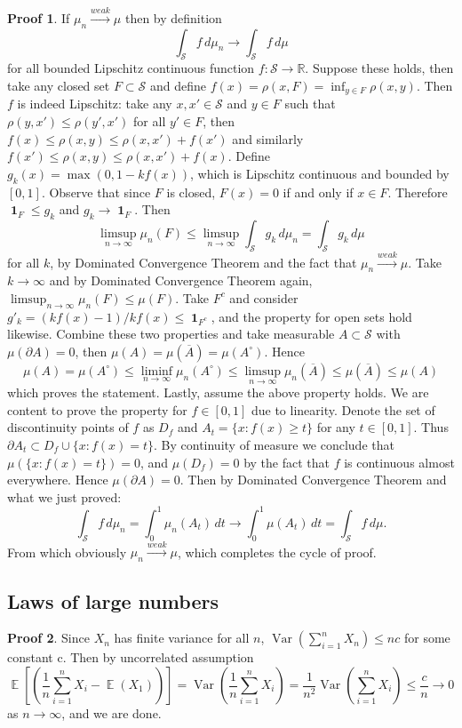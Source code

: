 \documentclass[hidelinks,11pt]{article}
\theoremstyle{definition}
\theoremstyle{dotless}
\newtheorem{prop}{Proof}[section]
\theoremstyle{remark}
\DeclareMathOperator{\Var}{Var}
\DeclareMathOperator{\E}{\mathbb{E}}
\DeclareMathOperator{\1}{\mathbf{1}}
\DeclareMathOperator{\0}{\mathbf{0}}
\begin{document}
\begin{prop}
If $\mu_n\xrightarrow{weak}\mu$ then by definition
\[\int_\mathcal{S}f\,d\mu_n\to\int_\mathcal{S}f\,d\mu\]
for all bounded Lipschitz continuous function $f:\mathcal{S}\to\mathbb{R}$.\medbreak
Suppose these holds, then take any closed set $F\subset\mathcal{S}$ and define $f(x)=\rho(x,F)=\inf_{y\in F}\rho(x,y)$. Then $f$ is indeed Lipschitz: take any $x,x'\in\mathcal{S}$ and $y\in F$ such that $\rho(y,x')\leq\rho(y',x')$ for all $y'\in F$, then $f(x)\leq\rho(x,y)\leq\rho(x,x')+f(x')$ and similarly $f(x')\leq\rho(x,y)\leq\rho(x,x')+f(x)$. Define $g_k(x)=\max(0,1-kf(x))$, which is Lipschitz continuous and bounded by $[0,1]$. Observe that since $F$ is closed, $F(x)=0$ if and only if $x\in F$. Therefore $\1_F\leq g_k$ and $g_k\to\1_F$. Then
\[\limsup_{n\to\infty}\mu_n(F)\leq\limsup_{n\to\infty}\int_\mathcal{S}g_k\,d\mu_n=\int_\mathcal{S}g_k\,d\mu\]
for all $k$, by Dominated Convergence Theorem and the fact that $\mu_n\xrightarrow{weak}\mu$. Take $k\to\infty$ and by Dominated Convergence Theorem again, $\limsup_{n\to\infty}\mu_n(F)\leq\mu(F)$. Take $F^c$ and consider $g'_k=(kf(x)-1)/kf(x)\leq\1_{F^c}$, and the property for open sets hold likewise.\medbreak
Combine these two properties and take measurable $A\subset\mathcal{S}$ with $\mu(\partial A)=0$, then $\mu(A)=\mu(\overline{A})=\mu(A^\circ)$. Hence
\[\mu(A)=\mu(A^\circ)\leq\liminf_{n\to\infty}\mu_n(A^\circ)\leq\limsup_{n\to\infty}\mu_n(\overline{A})\leq\mu(\overline{A})\leq\mu(A)\]
which proves the statement.\medbreak
Lastly, assume the above property holds. We are content to prove the property for $f\in[0,1]$ due to linearity. Denote the set of discontinuity points of $f$ as $D_f$ and $A_t=\{x:f(x)\geq t\}$ for any $t\in[0,1]$. Thus $\partial A_t\subset D_f\cup\{x:f(x)=t\}$. By continuity of measure we conclude that $\mu(\{x:f(x)=t\})=0$, and $\mu(D_f)=0$ by the fact that $f$ is continuous almost everywhere. Hence $\mu(\partial A)=0$. Then by Dominated Convergence Theorem and what we just proved:
\[\int_\mathcal{S}f\,d\mu_n=\int_0^1\mu_n(A_t)\,dt\to\int_0^1\mu(A_t)\,dt=\int_\mathcal{S}f\,d\mu.\]
From which obviously $\mu_n\xrightarrow{weak}\mu$, which completes the cycle of proof.
\end{prop}

\subsection{Laws of large numbers}

\begin{prop}
Since $X_n$ has finite variance for all $n$, $\Var(\sum_{i=1}^nX_n)\leq nc$ for some constant c. Then by uncorrelated assumption
\[\E\left[\left(\frac{1}{n}\sum_{i=1}^nX_i-\E(X_1)\right)\right]=\Var\left(\frac{1}{n}\sum_{i=1}^nX_i\right)=\frac{1}{n^2}\Var\left(\sum_{i=1}^nX_i\right)\leq\frac{c}{n}\to0\]
as $n\to\infty$, and we are done.
\end{prop}
\end{document}
